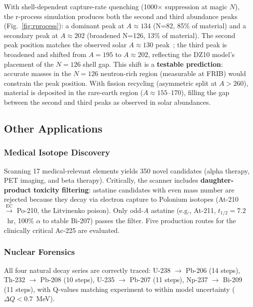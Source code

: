 \documentclass[twocolumn,letterpaper,10pt]{article}
\begin{document}
With shell-dependent capture-rate quenching (1000$\times$ suppression at
magic $N$), the r-process simulation produces both the second and third
abundance peaks (Fig.~\ref{fig:rprocess}): a dominant peak at $A \approx
134$ (N=82, 85\% of material) and a secondary peak at $A \approx 202$
(broadened N=126, 13\% of material). The second peak position matches the
observed solar $A \approx 130$ peak~\cite{cowan2021}; the third peak is
broadened and shifted from $A=195$ to $A \approx 202$, reflecting the
DZ10 model's placement of the $N=126$ shell gap. This shift is a
\textbf{testable prediction}: accurate masses in the $N=126$ neutron-rich
region (measurable at FRIB) would constrain the peak position. With
fission recycling (asymmetric split at $A > 260$), material is deposited
in the rare-earth region ($A \approx 155$--170), filling the gap between
the second and third peaks as observed in solar abundances.

\subsection{Other Applications}

\subsubsection{Medical Isotope Discovery}

Scanning 17 medical-relevant elements yields 350 novel candidates (alpha
therapy, PET imaging, and beta therapy). Critically, the scanner includes
\textbf{daughter-product toxicity filtering}: astatine candidates with even
mass number are rejected because they decay via electron capture to Polonium
isotopes (At-210 $\xrightarrow{\text{EC}}$ Po-210, the Litvinenko poison).
Only odd-$A$ astatine (e.g., At-211, $t_{1/2} = 7.2$~hr, 100\% $\alpha$
to stable Bi-207) passes the filter. Five production routes for the
clinically critical Ac-225 are evaluated.

\subsubsection{Nuclear Forensics}

All four natural decay series are correctly traced: U-238 $\to$ Pb-206 (14
steps), Th-232 $\to$ Pb-208 (10 steps), U-235 $\to$ Pb-207 (11 steps),
Np-237 $\to$ Bi-209 (11 steps), with Q-values matching experiment to
within model uncertainty ($\Delta Q < 0.7$~MeV).
\end{document}
